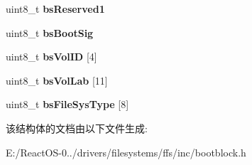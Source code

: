 \begin{DoxyCompactItemize}
\item 
\mbox{\label{structmbr__bpb_f_a_t32_a96e09138b81a835328aef73fd8aa8ab3}} 
uint8\+\_\+t {\bfseries bs\+Reserved1}
\item 
\mbox{\label{structmbr__bpb_f_a_t32_aefd206bac5e64c741dae0ee8928dac13}} 
uint8\+\_\+t {\bfseries bs\+Boot\+Sig}
\item 
\mbox{\label{structmbr__bpb_f_a_t32_aad68cb4642947ff2cf699c45b86be533}} 
uint8\+\_\+t {\bfseries bs\+Vol\+ID} \mbox{[}4\mbox{]}
\item 
\mbox{\label{structmbr__bpb_f_a_t32_ad4e21113f304ffa957778dca9c34b73e}} 
uint8\+\_\+t {\bfseries bs\+Vol\+Lab} \mbox{[}11\mbox{]}
\item 
\mbox{\label{structmbr__bpb_f_a_t32_aa294ed03d2b8910aeb68a04f980994a2}} 
uint8\+\_\+t {\bfseries bs\+File\+Sys\+Type} \mbox{[}8\mbox{]}
\end{DoxyCompactItemize}


该结构体的文档由以下文件生成\+:\begin{DoxyCompactItemize}
\item 
E\+:/\+React\+O\+S-\/0../drivers/filesystems/ffs/inc/bootblock.\+h\end{DoxyCompactItemize}
